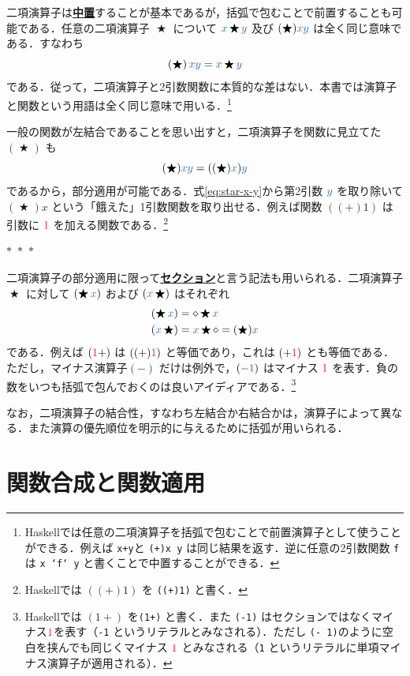 \documentclass[a5paper,twoside,fleqn,draft]{jsbook}
\def\constantColor{WildStrawberry}
\def\varColor{NavyBlue}
\newcommand{\separator}{\begin{center}$*$~$*$~$*$\end{center}}
\newcommand{\programminglanguage}[1]{\textsf{#1}}
\newcommand{\haskell}{\programminglanguage{Haskell}}
\newcommand{\keyword}[1]{{\underline{\textbf{#1}}}}
\newcommand{\code}[1]{\texttt{#1}}
\newcommand{\mConstant}[1]{\textcolor{\constantColor}{#1}}
\newcommand{\mOneNumber}{{\mConstant{1}}}
\newcommand{\mVar}[1]{\textcolor{\varColor}{#1}}
\newcommand{\mAnonParam}{\diamond}
\newcommand{\mXVar}{\mVar{x}}
\newcommand{\mYVar}{\mVar{y}}
\DeclareMathOperator{\mBinOp}{\bigstar}
\begin{document}
二項演算子は\keyword{中置}することが基本であるが，括弧で包むことで前置することも可能である．任意の二項演算子 $\mBinOp$ について $\mXVar\mBinOp\mYVar$ 及び $(\mBinOp)\mXVar\mYVar$ は全く同じ意味である．すなわち
\begin{equation}
  \left(\mBinOp\right)\mXVar\mYVar
  =\mXVar\mBinOp\mYVar
\end{equation}
である．従って，二項演算子と2引数関数に本質的な差はない．本書では演算子と関数という用語は全く同じ意味で用いる．\footnote{\haskell では任意の二項演算子を括弧で包むことで前置演算子として使うことができる．例えば \code{\mXVar+\mYVar}と \code{(+)x y} は同じ結果を返す．逆に任意の2引数関数 \code{f}は \code{x `f` y} と書くことで中置することができる．}

一般の関数が左結合であることを思い出すと，二項演算子を関数に見立てた
$(\mBinOp)$ も
\begin{equation}
  \label{eq:star-x-y}
  (\mBinOp)\mXVar\mYVar
  =((\mBinOp)\mXVar)\mYVar
\end{equation}
であるから，部分適用が可能である．式\eqref{eq:star-x-y}から第2引数 $\mYVar$ を取り除いて $(\mBinOp)x$ という「餓えた」1引数関数を取り出せる．例えば関数 $((+)1)$ は引数に $\mOneNumber$ を加える関数である．\footnote{\haskell では $((+)1)$ を \code{((+)1)} と書く．}

\separator

二項演算子の部分適用に限って\keyword{セクション}と言う記法も用いられる．二項演算子 $\mBinOp$ に対して $(\mBinOp\mXVar)$ および $(\mXVar\mBinOp)$ はそれぞれ
\begin{align}
  (\mBinOp\mXVar)
  &=\mAnonParam\mBinOp\mXVar\\
  (\mXVar\mBinOp)
  &=\mXVar\mBinOp\mAnonParam=(\mBinOp)\mXVar
\end{align}
である．例えば $(\mOneNumber+)$ は $((+)\mOneNumber)$ と等価であり，これは $(+\mOneNumber)$ とも等価である．ただし，マイナス演算子$(-)$ だけは例外で，$(-\mOneNumber)$ はマイナス $\mOneNumber$ を表す．負の数をいつも括弧で包んでおくのは良いアイディアである．\footnote{\haskell では $(1+)$ を\code{(1+)} と書く．また \code{(-1)} はセクションではなくマイナス$\mOneNumber$を表す（\code{-1} というリテラルとみなされる）．ただし \code{(- 1)}のように空白を挟んでも同じくマイナス $\mOneNumber$ とみなされる（\code{1} というリテラルに単項マイナス演算子が適用される）．}

なお，二項演算子の結合性，すなわち左結合か右結合かは，演算子によって異なる．また演算の優先順位を明示的に与えるために括弧が用いられる．

\section{関数合成と関数適用}
\end{document}
